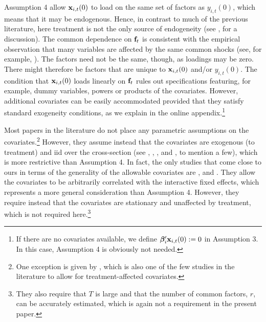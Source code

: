 \documentclass[12pt,fleqn]{article}
\begin{document}
  \bigskip
  
  Assumption 4 allow $\mathbf{x}_{i,t}(0)$ to load on the same set of factors as $y_{i,t}(0)$, which means that it may be endogenous. Hence, in contrast to much of the previous literature, here treatment is not the only source of endogeneity (see \citealp{Caetano_Callaway_Payne_Rodrigues_2022}, for a discussion). The common dependence on $\mathbf{f}_t$ is consistent with the empirical observation that many variables are affected by the same common shocks (see, for example, \citealp{westerlund2019cce}). The factors need not be the same, though, as loadings may be zero. There might therefore be factors that are unique to $\mathbf{x}_{i,t}(0)$ and/or $y_{i,t}(0)$. The condition that $\mathbf{x}_{i,t}(0)$ loads linearly on $\mathbf{f}_t$ rules out specifications featuring, for example, dummy variables, powers or products of the covariates. However, additional covariates can be easily accommodated provided that they satisfy standard exogeneity conditions, as we explain in the online appendix.\footnote{If there are no covariates available, we define $\boldsymbol{\beta}_i'\mathbf{x}_{i,t}(0) := 0$ in Assumption 3. In this case, Assumption 4 is obviously not needed.}
  
  Most papers in the literature do not place any parametric assumptions on the covariates.\footnote{One exception is given by \citet{Caetano_Callaway_Payne_Rodrigues_2022}, which is also one of the few studies in the literature to allow for treatment-affected covariates.} However, they assume instead that the covariates are exogenous (to treatment) and iid over the cross-section (see \citealp{Abadie_2005}, \citealp{Callaway_SantAnna_2020}, \citealp{Callaway_Karami_2020}, and \citealp{Caetano_Callaway_Payne_Rodrigues_2022}, to mention a few), which is more restrictive than Assumption 4. In fact, the only studies that come close to ours in terms of the generality of the allowable covariates are \citet{Gobillon_Magnac_2016}, and \citet{Xu_2017}. They allow the covariates to be arbitrarily correlated with the interactive fixed effects, which represents a more general consideration than Assumption 4. However, they require instead that the covariates are stationary and unaffected by treatment, which is not required here.\footnote{They also require that $T$ is large and that the number of common factors, $r$, can be accurately estimated, which is again not a requirement in the present paper.}
  
\end{document}
